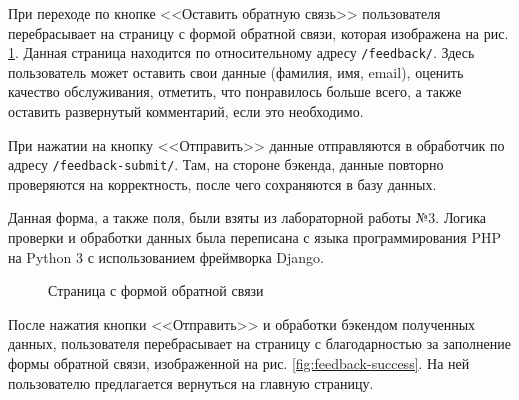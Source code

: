 \documentclass[a4paper, 14pt]{extarticle}
\begin{document}
При переходе по кнопке <<Оставить обратную связь>> пользователя перебрасывает на
страницу с формой обратной связи, которая изображена на рис. \ref{fig:feedback}.
Данная страница находится по относительному адресу \texttt{/feedback/}. Здесь
пользователь может оставить свои данные (фамилия, имя, email), оценить качество
обслуживания, отметить, что понравилось больше всего, а также оставить
развернутый комментарий, если это необходимо.

При нажатии на кнопку <<Отправить>> данные отправляются в обработчик по адресу
\texttt{/feedback-submit/}. Там, на стороне бэкенда, данные повторно проверяются
на корректность, после чего сохраняются в базу данных.

Данная форма, а также поля, были взяты из лабораторной работы №3. Логика
проверки и обработки данных была переписана с языка программирования PHP на
Python 3 с использованием фреймворка Django.

\begin{figure}[H]
  \centering
  \caption{Страница с формой обратной связи}
  \label{fig:feedback}
\end{figure}

После нажатия кнопки <<Отправить>> и обработки бэкендом полученных данных,
пользователя перебрасывает на страницу с благодарностью за заполнение формы
обратной связи, изображенной на рис. \ref{fig:feedback-success}. На ней
пользователю предлагается вернуться на главную страницу.
\end{document}
